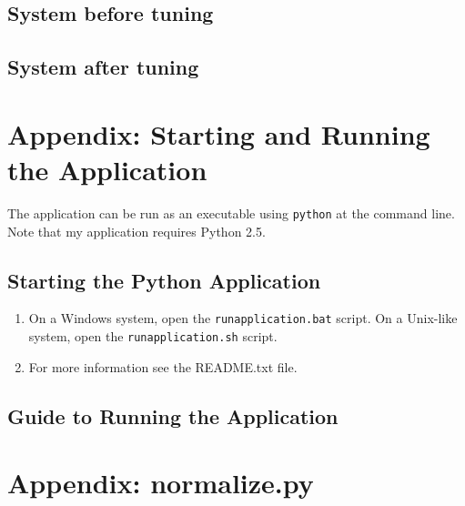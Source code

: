 \documentclass[12pt,letterpaper,oneside]{report}
\newcommand \code[1]{\texttt{#1}}
\begin{document}
\subsection{System before tuning}



\subsection{System after tuning}

\clearpage
\section{Appendix: Starting and Running the Application}\label{apx:running}
The application can be run as an executable using \texttt{python} at the command line.
Note that my application requires Python 2.5.

\subsection{Starting the Python Application}
\begin{enumerate}
  \item On a Windows system, open the \code{runapplication.bat} script. On a
      Unix-like system, open the \code{runapplication.sh} script.
  \item For more information see the README.txt file.
\end{enumerate}

\subsection{Guide to Running the Application}

\section{Appendix: normalize.py}\label{apx:running}


\end{document}
